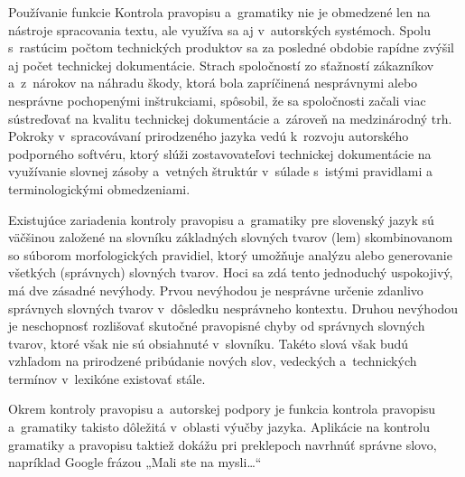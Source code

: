 \begin{multicols}{2}
Používanie funkcie Kontrola pravopisu a~gramatiky nie je obmedzené
len na nástroje spracovania textu, ale využíva sa aj
v~autorských systémoch. Spolu s~rastúcim počtom technických
produktov sa za posledné obdobie rapídne zvýšil aj počet technickej
dokumentácie. Strach spoločností zo sťažností zákazníkov
a~z~nárokov na náhradu škody, ktorá bola zapríčinená nesprávnymi
alebo nesprávne pochopenými inštrukciami, spôsobil, že sa
spoločnosti začali viac sústreďovať na kvalitu technickej
dokumentácie a~zároveň na medzinárodný trh. Pokroky
v~spracovávaní prirodzeného jazyka vedú k~rozvoju autorského
podporného softvéru, ktorý slúži zostavovateľovi technickej
dokumentácie na využívanie slovnej zásoby a~vetných štruktúr
v~súlade s~istými pravidlami a terminologickými
obmedzeniami.



Existujúce zariadenia kontroly pravopisu a~gramatiky pre slovenský
jazyk sú väčšinou založené na slovníku základných slovných
tvarov (lem) skombinovanom so súborom morfologických pravidiel, ktorý
umožňuje analýzu alebo generovanie všetkých (správnych) slovných
tvarov. Hoci sa zdá tento jednoduchý uspokojivý, má dve
zásadné nevýhody. Prvou nevýhodou je nesprávne určenie zdanlivo
správnych slovných tvarov v~dôsledku nesprávneho kontextu. Druhou
nevýhodou je neschopnosť rozlišovať skutočné pravopisné chyby od
správnych slovných tvarov, ktoré však nie sú obsiahnuté
v~slovníku. Takéto slová však budú vzhľadom na prirodzené
pribúdanie nových slov, vedeckých a~technických termínov
v~lexikóne existovať stále.

Okrem kontroly pravopisu a~autorskej podpory je funkcia kontrola
pravopisu a~gramatiky takisto dôležitá v~oblasti výučby jazyka. Aplikácie na kontrolu gramatiky a pravopisu taktiež dokážu pri preklepoch navrhnúť správne slovo, napríklad Google frázou „Mali ste na mysli\dots“


\end{multicols}
